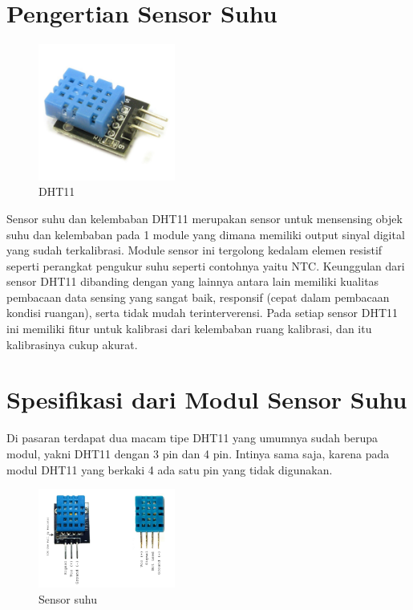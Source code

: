 \documentclass{article}
\begin{document}

\section{Pengertian Sensor Suhu}

\begin{figure}[ht]
	\centerline{\includegraphics[width=0.4\textwidth]{figures/sensor.jpg}}
	\caption{DHT11}
	\label{DHT11}
\end{figure}

Sensor suhu dan kelembaban DHT11 merupakan sensor untuk mensensing objek suhu dan kelembaban pada 1 module yang dimana memiliki output sinyal digital yang sudah terkalibrasi.
Module sensor ini tergolong kedalam elemen resistif seperti perangkat pengukur suhu seperti contohnya yaitu NTC.
Keunggulan dari sensor DHT11 dibanding dengan yang lainnya antara lain memiliki kualitas pembacaan data sensing yang sangat baik, responsif (cepat dalam pembacaan kondisi ruangan), serta tidak mudah terinterverensi.
Pada setiap sensor DHT11 ini memiliki fitur untuk kalibrasi dari kelembaban ruang kalibrasi, dan itu kalibrasinya cukup akurat.

\section{Spesifikasi dari Modul Sensor Suhu}

Di pasaran terdapat dua macam tipe DHT11 yang umumnya sudah berupa modul, yakni DHT11 dengan 3 pin dan 4 pin. Intinya sama saja, karena pada modul DHT11 yang berkaki 4 ada satu pin yang tidak digunakan.

\begin{figure}[ht]
	\centerline{\includegraphics[width=0.4\textwidth]{figures/DHT11.jpg}}
	\caption{Sensor suhu}
	\label{DHT11}
\end{figure}
\end{document}
